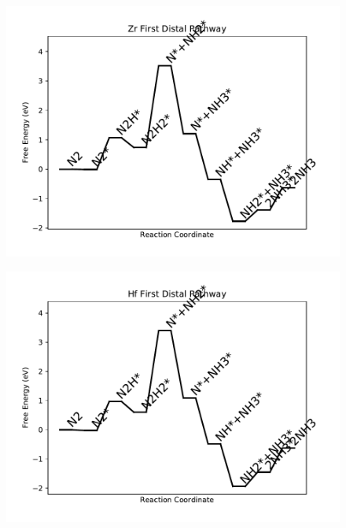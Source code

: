 \begin{figure}
\includegraphics[width=0.8\linewidth]{data/plots/Zr_distal_1.pdf}
\label{fig:Zr_distal_1}
\end{figure}

\begin{figure}
\includegraphics[width=0.8\linewidth]{data/plots/Hf_distal_1.pdf}
\label{fig:Hf_distal_1}
\end{figure}

